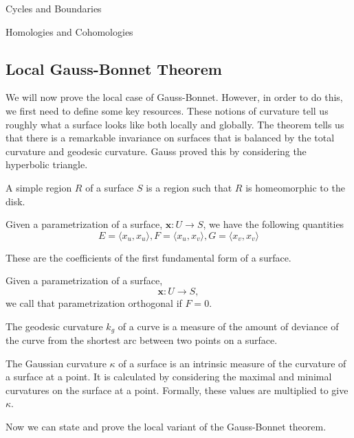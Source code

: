\begin{subsubsection}{Cycles and Boundaries}
\begin{subsubsection}{Homologies and Cohomologies}
\subsection{Local Gauss-Bonnet Theorem}
\begin{remark} We will now prove the local case of Gauss-Bonnet. However, in
  order to do this, we first need to define some key resources. These notions
  of curvature tell us roughly what a surface looks like both locally and 
  globally. The theorem tells us that there is a remarkable invariance on
  surfaces that is balanced by the total curvature and geodesic curvature.
  Gauss proved this by considering the hyperbolic triangle.
\end{remark}
\begin{definition}
  A simple region $R$ of a surface $S$ is a region such that $R$ is
  homeomorphic to the disk.
\end{definition}
\begin{definition}
  Given a parametrization of a surface, $\textbf{x}: U\rightarrow S$, we have
  the following quantities
  \begin{equation}
    E = \langle x_u, x_u\rangle, F=\langle x_u,x_v\rangle, G=\langle
    x_v,x_v\rangle
  \end{equation}
\end{definition}
These are the coefficients of the first fundamental form of a surface.
\begin{definition}
  Given a parametrization of a surface,
  \begin{equation}
    \textbf{x}:U\rightarrow S,
  \end{equation}
  we call that parametrization orthogonal if $F=0$.
\end{definition}
\begin{definition}
  The geodesic curvature $k_g$ of a curve is a measure of the amount of
  deviance of the curve from the shortest arc between two points on a surface.
\end{definition}
\begin{definition}
  The Gaussian curvature $\kappa$ of a surface is an intrinsic measure of the
  curvature of a surface at a point. It is calculated by considering the
  maximal and minimal curvatures on the surface at a point. Formally, these
  values are multiplied to give $\kappa$.
\end{definition}
Now we can state and prove the local variant of the Gauss-Bonnet theorem.

\end{subsubsection}
\end{subsubsection}
